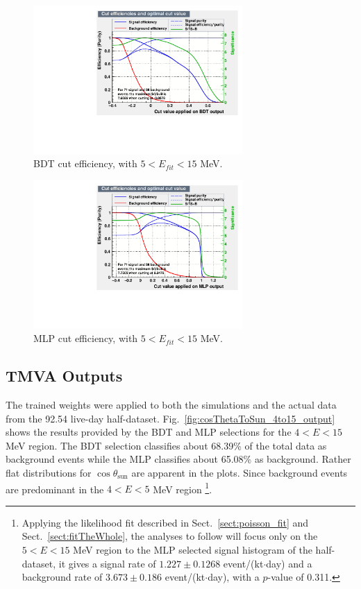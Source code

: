 \begin{figure}[!htb]
	\centering
	\includegraphics[width=8cm]{cutEfficiencyBDT.pdf}
	\caption[BDT cut efficiency, with $5<E_{fit}<15$ MeV.]{BDT cut efficiency, with $5<E_{fit}<15$ MeV.\label{fig:TMVAcutEffiencyBDT}}
\end{figure}

\begin{figure}[!htb]
	\centering
	\includegraphics[width=8cm]{cutEfficiencyMLP.pdf}
	\caption[MLP cut efficiency, with $5<E_{fit}<15$ MeV.]{MLP cut efficiency, with $5<E_{fit}<15$ MeV. \label{fig:TMVAcutEffiencyMLP}}
\end{figure}

\subsection{TMVA Outputs}\label{sect:tmvaOutput}

The trained weights were applied to both the simulations and the actual data from the 92.54 live-day half-dataset.  Fig.~\ref{fig:cosThetaToSun_4to15_output} shows the results provided by the BDT and MLP selections for the $4<E<15$ MeV region. The BDT selection classifies about 68.39\% of the total data as background events while the MLP classifies about 65.08\% as background. Rather flat distributions for $\cos\theta_\mathrm{sun}$ are apparent in the plots. Since background events are predominant in the $4<E<5$ MeV region \footnote{Applying the likelihood fit described in Sect.~\ref{sect:poisson_fit} and Sect.~\ref{sect:fitTheWhole}, the analyses to follow will focus only on the $5<E<15$ MeV region to the MLP selected signal histogram of the half-dataset, it gives a signal rate of $1.227\pm0.1268$ event/(kt$\cdot$day) and a background rate of $3.673\pm0.186$ event/(kt$\cdot$day), with a $p$-value of 0.311.}.

